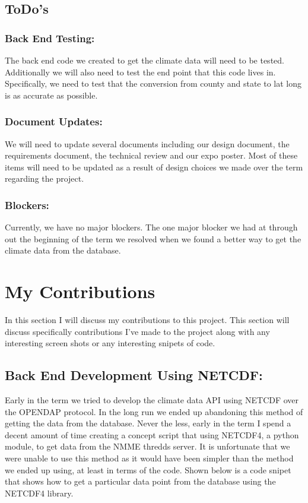 \documentclass[onecolumn, draftclsnofoot,10pt, compsoc]{article}
\begin{document}
	\subsection{ToDo's}
		\subsubsection{Back End Testing:}
		The back end code we created to get the climate data will need to be tested. Additionally we will also need to test the end point that this code lives in. Specifically, we need to test that the conversion from county and state to lat long is as accurate as possible.\\
		
		\subsubsection{Document Updates:}
		We will need to update several documents including our design document, the requirements document, the technical review and our expo poster. Most of these items will need to be updated as a result of design choices we made over the term regarding the project.\\

		\subsubsection{Blockers:}
		Currently, we have no major blockers. The one major blocker we had at through out the beginning of the term we resolved when we found a better way to get the climate data from the database.\\

\section{My Contributions}
	In this section I will discuss my contributions to this project. This section will discuss specifically contributions I've made to the project along with any interesting screen shots or any interesting snipets of code.\\

		\subsection{Back End Development Using NETCDF:}
		Early in the term we tried to develop the climate data API using NETCDF over the OPENDAP protocol. In the long run we ended up abandoning this method of getting the data from the database. Never the less, early in the term I spend a decent amount of time creating a concept script that using NETCDF4, a python module, to get data from the NMME thredds server. It is unfortunate that we were unable to use this method as it would have been simpler than the method we ended up using, at least in terms of the code. Shown below is a code snipet that shows how to get a particular data point from the database using the NETCDF4 library.\\
		
\end{document}
